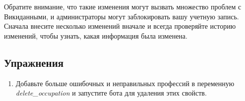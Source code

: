 Обратите внимание, что такие изменения могут вызвать множество проблем с Викиданными, и администраторы могут заблокировать вашу учетную запись. Сначала внесите несколько изменений вначале и всегда проверяйте историю изменений, чтобы узнать, какая информация была изменена.

\subsection{Упражнения}

\begin{enumerate} 
\item Добавьте больше ошибочных и неправильных профессий в переменную \textit{delete\_occupation} и запустите бота для удаления этих свойств.
\end{enumerate}



\makeatletter
\long{}%
\makeatother
